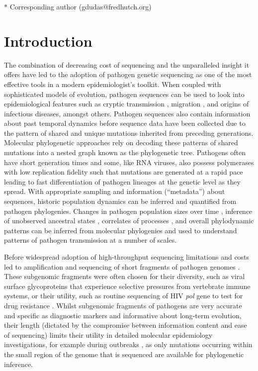 \documentclass[11pt,oneside,letterpaper]{article}
\begin{document}
$\ast$ \footnotesize{Corresponding author (gdudas@fredhutch.org)}

\pagebreak

\section*{Introduction}
The combination of decreasing cost of sequencing and the unparalleled insight it offers have led to the adoption of pathogen genetic sequencing as one of the most effective tools in a modern epidemiologist's toolkit.
When coupled with sophisticated models of evolution, pathogen sequences can be used to look into epidemiological features such as cryptic transmission \citep{faria_establishment_2017}, migration \citep{lemey_bayesian_2009,lemey_unifying_2014}, and origins \citep{smith_origins_2009} of infectious diseases, amongst others.
Pathogen sequences also contain information about past temporal dynamics before sequence data have been collected \citep{raghwani_origin_2012} due to the pattern of shared and unique mutations inherited from preceding generations.
Molecular phylogenetic approaches rely on decoding these patterns of shared mutations into a nested graph known as the phylogenetic tree.
Pathogens often have short generation times and some, like RNA viruses, also possess polymerases with low replication fidelity such that mutations are generated at a rapid pace \citep{drummond_measurably_2003,biek_measurably_2015} leading to fast differentiation of pathogen lineages at the genetic level as they spread.
With appropriate sampling and information (``metadata'') about sequences, historic population dynamics can be inferred and quantified from pathogen phylogenies.
Changes in pathogen population sizes over time \citep{pybus_integrated_2000}, inference of unobserved ancestral states \citep{lemey_bayesian_2009,dudas_mers-cov_2018}, correlates of processes \citep{faria_simultaneously_2013,lemey_unifying_2014,dudas_virus_2017}, and overall phylodynamic \citep{grenfell_unifying_2004} patterns can be inferred from molecular phylogenies and used to understand patterns of pathogen transmission at a number of scales.

Before widespread adoption of high-throughput sequencing limitations and costs led to amplification and sequencing of short fragments of pathogen genomes \citep{jin_genetic_1999,jin_proposal_2005}.
These subgenomic fragments were often chosen for their diversity, such as viral surface glycoproteins that experience selective pressures from vertebrate immune systems, or their utility, such as routine sequencing of HIV \textit{pol} gene to test for drug resistance \citep{kaye_phylogenetic_2008,rhee_human_2003}.
Whilst subgenomic fragments of pathogens are very accurate and specific as diagnostic markers and informative about long-term evolution, their length (dictated by the compromise between information content and ease of sequencing) limits their utility in detailed molecular epidemiology investigations, for example during outbreaks \citep{wohl_co-circulating_2018}, as only mutations occurring within the small region of the genome that is sequenced are available for phylogenetic inference.
\end{document}
